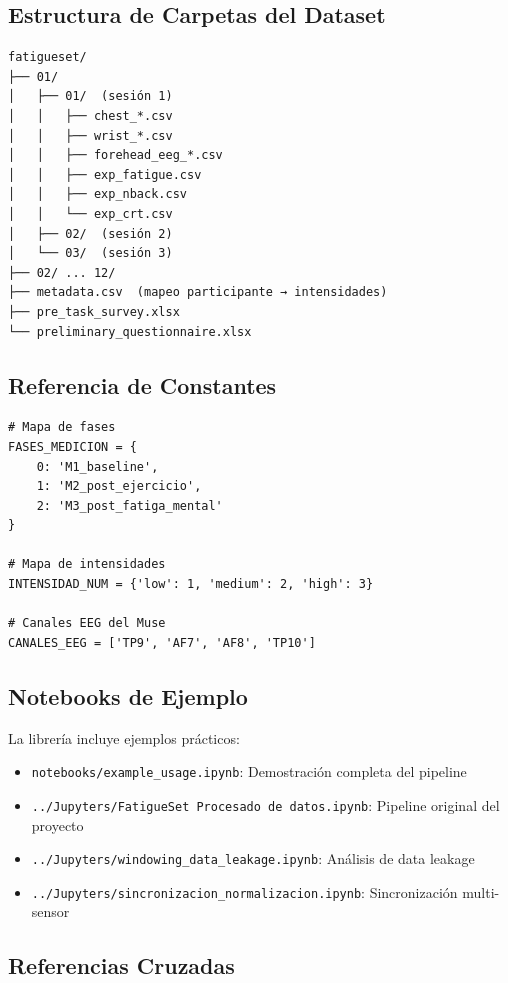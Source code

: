 \documentclass[12pt,a4paper]{article}
\begin{document}
\subsection{Estructura de Carpetas del Dataset}

\begin{lstlisting}
fatigueset/
├── 01/
│   ├── 01/  (sesión 1)
│   │   ├── chest_*.csv
│   │   ├── wrist_*.csv
│   │   ├── forehead_eeg_*.csv
│   │   ├── exp_fatigue.csv
│   │   ├── exp_nback.csv
│   │   └── exp_crt.csv
│   ├── 02/  (sesión 2)
│   └── 03/  (sesión 3)
├── 02/ ... 12/
├── metadata.csv  (mapeo participante → intensidades)
├── pre_task_survey.xlsx
└── preliminary_questionnaire.xlsx
\end{lstlisting}

\subsection{Referencia de Constantes}

\begin{lstlisting}
# Mapa de fases
FASES_MEDICION = {
    0: 'M1_baseline',
    1: 'M2_post_ejercicio',
    2: 'M3_post_fatiga_mental'
}

# Mapa de intensidades
INTENSIDAD_NUM = {'low': 1, 'medium': 2, 'high': 3}

# Canales EEG del Muse
CANALES_EEG = ['TP9', 'AF7', 'AF8', 'TP10']
\end{lstlisting}

\subsection{Notebooks de Ejemplo}

La librería incluye ejemplos prácticos:

\begin{itemize}
    \item \texttt{notebooks/example\_usage.ipynb}: Demostración completa del pipeline
    \item \texttt{../Jupyters/FatigueSet Procesado de datos.ipynb}: Pipeline original del proyecto
    \item \texttt{../Jupyters/windowing\_data\_leakage.ipynb}: Análisis de data leakage
    \item \texttt{../Jupyters/sincronizacion\_normalizacion.ipynb}: Sincronización multi-sensor
\end{itemize}

\subsection{Referencias Cruzadas}
\end{document}
